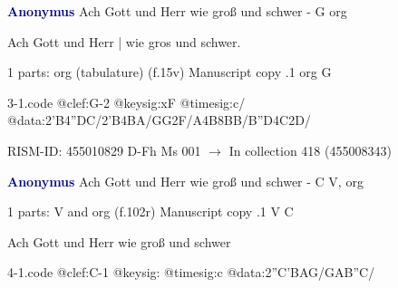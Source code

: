 \documentclass[twocolumn]{book}
\begin{document}
\newline \par \vspace{7pt} \textcolor{darkblue}{\textbf{Anonymus  }}
\newline Ach Gott und Herr wie groß und schwer - G
\newline org
\newline \begin{itshape}[f.15v, at left:] Ach Gott und Herr | wie gros und schwer.\end{itshape} 
\newline \textcolor{darkblue}{}  1 parts: org (tabulature)  (f.15v)
\newline Manuscript copy
.1  org  G  
\begin{filecontents*}{3-1.code}
@clef:G-2
@keysig:xF
@timesig:c/
@data:2'B4''DC/2'B4BA/GG2F/A4B{8BB}/{B''D}4C2D/
\end{filecontents*}
\newline
%

\newline RISM-ID: 455010829
\newline D-Fh  Ms 001
\newline $\rightarrow$ In collection 418 (455008343)
      
\newline \par \vspace{7pt} \textcolor{darkblue}{\textbf{Anonymus  }}
\newline Ach Gott und Herr wie groß und schwer - C
\newline V, org
\newline \begin{itshape}\end{itshape} 
\newline \textcolor{darkblue}{}  1 parts: V and org  (f.102r)
\newline Manuscript copy
.1  V  C
\newline \begin{footnotesize} Ach Gott und Herr wie groß und schwer \end{footnotesize}  
\begin{filecontents*}{4-1.code}
@clef:C-1
@keysig:
@timesig:c
@data:2''C'BAG/GAB''C/
\end{filecontents*}
\newline
%
\end{document}
